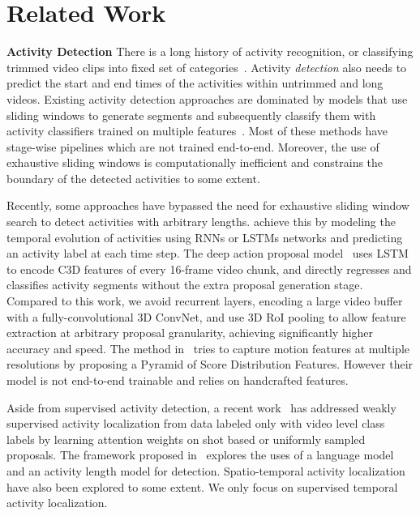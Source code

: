 \documentclass[10pt,twocolumn,letterpaper]{article}
\begin{document}
 \section{Related Work}

\textbf{Activity Detection}
There is a long history of activity recognition, or classifying trimmed video clips into fixed set of categories~\cite{ji20133d, laptev2008learning, yue2015beyond, simonyan2014two, wang2013action, Zheng2016}.
Activity \textit{detection} also needs to predict the start and end times of the activities within untrimmed and long videos.
Existing activity detection approaches are dominated by models that use sliding windows to generate segments and subsequently classify them with activity classifiers trained on multiple features~\cite{karaman2014fast, oneata2014lear, shou2016temporal, wang2014action}.
Most of these methods have stage-wise pipelines which are not trained end-to-end.
Moreover, the use of exhaustive sliding windows is computationally inefficient and constrains the boundary of the detected activities to some extent.

Recently, some approaches have bypassed the need for exhaustive sliding window search to detect activities with arbitrary lengths.
\cite{escorcia2016daps, ma2016learning, montes2016temporal, Singh2016a, yeung2016end} achieve this by modeling the temporal evolution of activities using RNNs or LSTMs networks and predicting an activity label at each time step.
The deep action proposal model~\cite{escorcia2016daps} uses LSTM to encode C3D features of every 16-frame video chunk, and directly regresses and classifies activity segments without the extra proposal generation stage.
Compared to this work, we avoid recurrent layers, encoding a large video buffer with a fully-convolutional 3D ConvNet, and use 3D RoI pooling to allow feature extraction at arbitrary proposal granularity, achieving significantly higher accuracy and speed.
The method in~\cite{yuan2016temporal} tries to capture motion features at multiple resolutions by proposing a Pyramid of Score Distribution Features.
However their model is not end-to-end trainable and relies on handcrafted features.

Aside from supervised activity detection, a recent work~\cite{Wang2017UntrimmedNets} has addressed weakly supervised activity localization from data labeled only with video level class labels by learning attention weights on shot based or uniformly sampled proposals.
The framework proposed in~\cite{Richard_2016_CVPR} explores the uses of a language model and an activity length model for detection.
Spatio-temporal activity localization~\cite{Weinzaepfel_2015_ICCV, Yu_2015_CVPR} have also been explored to some extent.
We only focus on supervised temporal activity localization.
\end{document}
